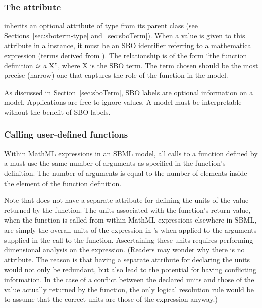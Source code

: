 \subsubsection{The  attribute}
\label{sec:functiondefinition-sboterm}

\FunctionDefinition inherits an optional 
attribute of type  from its parent
class \SBase (see Sections~\ref{sec:sboterm-type}
and~\ref{sec:sboTerm}).  When a value is given to this
attribute in a \FunctionDefinition instance, it must be an
SBO identifier referring to a mathematical expression
(\ie terms derived from \sbomathformula).  The relationship is
of the form ``the function definition \emph{is a} X'', where X is
the SBO term.  The term chosen should be the most precise (narrow)
one that captures the role of the function in the model.

As discussed in Section~\ref{sec:sboTerm}, SBO labels are optional
information on a model.  Applications are free to ignore
 values.  A model must be interpretable without the
benefit of SBO labels.


\begin{blockChanged}

\subsubsection{Calling user-defined functions}
\label{sec:functiondefinition-calling}

Within MathML expressions in an SBML model, all calls to a
function defined by a \FunctionDefinition must use the same number
of arguments as specified in the function's definition.  The
number of arguments is equal to the number of 
elements inside the  element of the function
definition.

\end{blockChanged}

Note that \FunctionDefinition does not have a separate attribute
for defining the units of the value returned by the function.  The
units associated with the function's return value, when the
function is called from within MathML expressions elsewhere in
SBML, are simply the overall units of the expression in \FunctionDefinition's
 when applied to the arguments supplied in the call to
the function.  Ascertaining these units requires performing
dimensional analysis on the expression.  (Readers may wonder why
there is no attribute.  The reason is that having a separate
attribute for declaring the units would not only be redundant, but
also lead to the potential for having conflicting information.  In
the case of a conflict between the declared units and those of the
value actually returned by the function, the only logical
resolution rule would be to assume that the correct units are
those of the expression anyway.)


